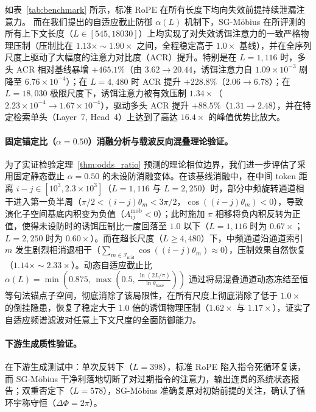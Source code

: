 \documentclass[11pt,a4paper]{article}
\theoremstyle{definition}
\begin{document}
如表~\ref{tab:benchmark} 所示，标准 RoPE 在所有长度下均向失效前提持续泄漏注意力。
而在我们提出的自适应截止防御 $\alpha(L)$ 机制下，SG-M\"obius 在所评测的所有上下文长度（$L \in [545, 18030]$）上均实现了对失效诱饵注意力的一致严格物理压制（压制比在 $1.13\times\sim 1.90\times$ 之间，全程稳定高于 $1.0\times$ 基线），并在全序列尺度上驱动了大幅度的注意力对比度（ACR）提升。特别是在 $L=1,116$ 时，多头 ACR 相对基线暴增 $+465.1\%$（由 $3.62\to 20.44$，诱饵注意力自 $1.09\times 10^{-3}$ 剧降至 $6.76\times 10^{-4}$）；在 $L=4,480$ 时 ACR 提升 $+228.8\%$（$2.06\to 6.78$）；在 $L=18,030$ 极限尺度下，诱饵注意力被有效压制 $1.34\times$（$2.23\times 10^{-4} \to 1.67\times 10^{-4}$），驱动多头 ACR 提升 $+88.5\%$（$1.31\to 2.48$），并在特定检索单头（Layer~7, Head~4）上达到了高达 $16.4\times$ 的峰值优势比放大。



\paragraph{固定锚定比（$\alpha=0.50$）消融分析与载波反向混叠理论验证。}
为了实证检验定理~\ref{thm:odds_ratio} 预测的理论相位边界，我们进一步评估了采用固定静态截止 $\alpha=0.50$ 的未设防消融变体。在该基线消融中，在中间 token 距离 $i - j \in [10^3, 2.3 \times 10^3]$（$L=1,116$ 与 $L=2,250$）时，部分中频旋转通道相干进入第一负半周（$\pi/2 < (i-j)\theta_m < 3\pi/2$，$\cos((i-j)\theta_m) < 0$），导致演化子空间基底内积变为负值（$A_{ij}^{\text{mob}} < 0$）；此时施加 $\pi$ 相移将负内积反转为正值，使得未设防时的诱饵压制比一度回落至 $1.0$ 以下（$L=1,116$ 时为 $0.67\times$；$L=2,250$ 时为 $0.60\times$）。而在超长尺度（$L \ge 4,480$）下，中频通道沿通道索引 $m$ 发生剧烈相消退相干（$\sum_{m \in \mathcal{I}_{\text{mid}}} \cos((i-j)\theta_m) \approx 0$），压制效果自然恢复（$1.14\times\sim 2.33\times$）。动态自适应截止比 $\alpha(L) = \min\left(0.875, \, \max\left(0.5, \, \frac{\ln(2L/\pi)}{\ln \theta_{\mathrm{base}}}\right)\right)$ 通过将易混叠通道动态冻结至恒等句法锚点子空间，彻底消除了该局限性，在所有尺度上彻底消除了低于 $1.0\times$ 的倒挂隐患，恢复了稳定大于 1.0 倍的诱饵物理压制（$1.62\times$ 与 $1.17\times$），证实了自适应频谱滤波对任意上下文尺度的全面防御能力。

\paragraph{下游生成质性验证。}
在下游生成测试中：单次反转下（$L=398$），标准 RoPE 陷入指令死循环复读，而 SG-M\"obius 干净利落地切断了对过期指令的注意力，输出连贯的系统状态报告；双重否定下（$L=578$），SG-M\"obius 准确复原对初始前提的关注，确认了循环宇称守恒（$\Delta\Phi = 2\pi$）。
\end{document}
